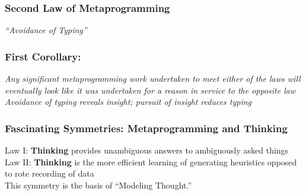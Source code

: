 \documentclass[slidestop,compress,mathserif]{beamer}
\begin{document}
\begin{frame}
	\frametitle{Second Law of Metaprogramming}
	\pause
	\vskip 0.5cm
	\pause
	\vskip 0.5cm
	\begin{center}
		\emph{``Avoidance of Typing''}
	\end{center}
\end{frame}

\begin{frame}
	\frametitle{First Corollary:}
	\begin{center}
		\emph{Any significant metaprogramming work undertaken to meet either of
    the laws will eventually look like it was undertaken for a reason in
    service to the opposite law}
		\pause
		\vskip 0.5cm
		\emph{Avoidance of typing reveals insight; pursuit of insight reduces typing}
	\end{center}
\end{frame}

\begin{frame}
	\frametitle{Fascinating Symmetries:  Metaprogramming and Thinking}
	Law I:  \textbf{Thinking} provides unambiguous answers to ambiguously asked things \\
	Law II: \textbf{Thinking} is the more efficient learning of generating heuristics opposed to rote recording of data \\
	\vskip 0.5cm
	This symmetry is the basis of ``Modeling Thought.''
\end{frame}
\end{document}
